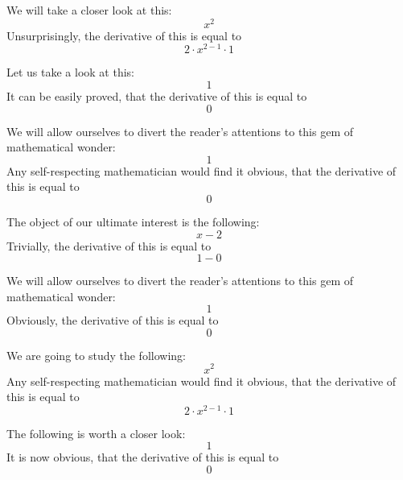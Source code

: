 \documentclass{article}
\begin{document}
We will take a closer look at this:
\begin{equation}
x ^{2 } 
\end{equation}
Unsurprisingly, the derivative of this is equal to
\begin{equation}
2 \cdot x ^{2 - 1 } \cdot 1 
\end{equation}

Let us take a look at this:
\begin{equation}
1 
\end{equation}
It can be easily proved, that the derivative of this is equal to
\begin{equation}
0 
\end{equation}

We will allow ourselves to divert the reader's attentions to this gem of mathematical wonder:
\begin{equation}
1 
\end{equation}
Any self-respecting mathematician would find it obvious, that the derivative of this is equal to
\begin{equation}
0 
\end{equation}

The object of our ultimate interest is the following:
\begin{equation}
x - 2 
\end{equation}
Trivially, the derivative of this is equal to
\begin{equation}
1 - 0 
\end{equation}

We will allow ourselves to divert the reader's attentions to this gem of mathematical wonder:
\begin{equation}
1 
\end{equation}
Obviously, the derivative of this is equal to
\begin{equation}
0 
\end{equation}

We are going to study the following:
\begin{equation}
x ^{2 } 
\end{equation}
Any self-respecting mathematician would find it obvious, that the derivative of this is equal to
\begin{equation}
2 \cdot x ^{2 - 1 } \cdot 1 
\end{equation}

The following is worth a closer look:
\begin{equation}
1 
\end{equation}
It is now obvious, that the derivative of this is equal to
\begin{equation}
0 
\end{equation}
\end{document}
